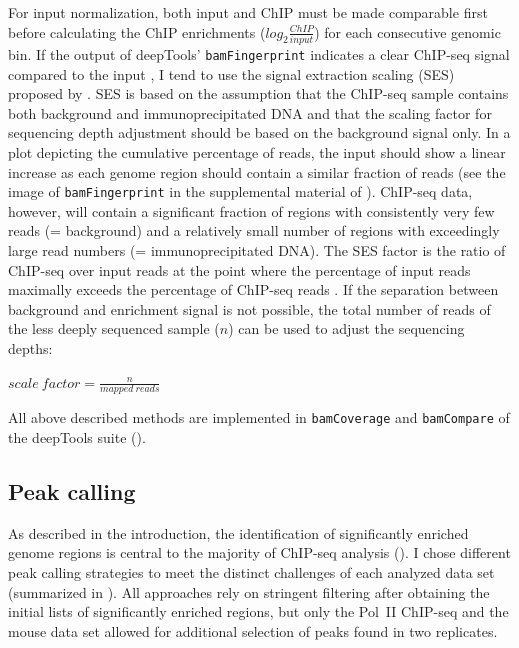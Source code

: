 For input normalization, both input and ChIP must be made comparable first before calculating the ChIP enrichments ($log_2\frac{ChIP}{input}$) for each consecutive genomic bin. If the output of deepTools’ \texttt{bamFingerprint} \citep{Diaz2012} indicates a clear ChIP-seq signal compared to the input \citep{bamFingerprint}, I tend to use the signal extraction scaling (SES) proposed by \citet{Diaz2012}. SES is based on the assumption that the ChIP-seq sample contains both background and immunoprecipitated DNA and that the scaling factor for sequencing depth adjustment should be based on the background signal only. In a plot depicting the cumulative percentage of reads, the input should show a linear increase as each genome region should contain a similar fraction of reads (see the image of \texttt{bamFingerprint} in the supplemental material of ). ChIP-seq data, however, will contain a significant fraction of regions with consistently very few reads (= background) and a relatively small number of regions with exceedingly large read numbers (= immunoprecipitated DNA). The SES factor is the ratio of ChIP-seq over input reads at the point where the percentage of input reads maximally exceeds the percentage of ChIP-seq reads \citep{Diaz2012}.
If the separation between background and enrichment signal is not possible, the total number of reads of the less deeply sequenced sample ($n$) can be used to adjust the sequencing depths:
\begin{center}
$ scale\:f\!actor = \frac{n}{mapped\:reads}$ \\
\end{center}
All above described methods are implemented in \texttt{bamCoverage} and \texttt{bamCompare} of the deepTools suite ().
%
\subsection{Peak calling}
%
As described in the introduction, the identification of significantly enriched genome regions is central to the majority of ChIP-seq analysis \citep{Bailey2013} (). I chose different peak calling strategies to meet the distinct challenges of each analyzed data set (summarized in ). All approaches rely on stringent filtering after obtaining the initial lists of significantly enriched regions, but only the Pol~II ChIP-seq and the mouse data set allowed for additional selection of peaks found in two replicates. 
%
%
